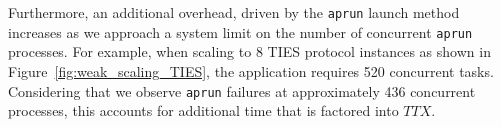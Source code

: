 Furthermore, an additional overhead, driven by the \texttt{aprun} launch
method increases as we approach a system limit on the number of concurrent
\texttt{aprun} processes. For example, when scaling to 8 TIES protocol
instances as shown in Figure~\ref{fig:weak_scaling_TIES}, the application
requires 520 concurrent tasks. Considering that we observe \texttt{aprun}
failures at approximately 436 concurrent processes, this accounts for
additional time that is factored into \(TTX\).  







